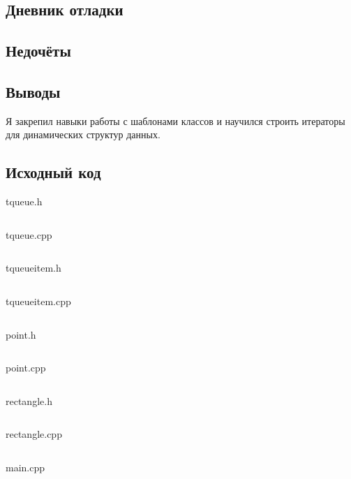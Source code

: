 \documentclass[12pt]{article}
\begin{document}
\subsection*{Дневник отладки}


\subsection*{Недочёты}


\subsection*{Выводы}

Я закрепил навыки работы с шаблонами классов и научился строить итераторы для динамических структур данных.


\vfill

\subsection*{Исходный код}

{\Huge tqueue.h}
\inputminted{C++}{tqueue.h}
    \pagebreak

{\Huge tqueue.cpp}
\inputminted{C++}{tqueue.inl}
\pagebreak

{\Huge tqueueitem.h}
\inputminted{C++}{tqueueitem.h}
\pagebreak

{\Huge tqueueitem.cpp}
\inputminted{C++}{tqueueitem.inl}
\pagebreak
    
{\Huge point.h}
\inputminted{C++}{point.h}
    \pagebreak

{\Huge point.cpp}
\inputminted{C++}{point.cpp}
    \pagebreak

{\Huge rectangle.h}
\inputminted{C++}{rectangle.h}
\pagebreak

{\Huge rectangle.cpp}
\inputminted{C++}{rectangle.cpp}
\pagebreak
    
{\Huge main.cpp}
\inputminted{C++}{main.cpp}
    \pagebreak
    
\end{document}
